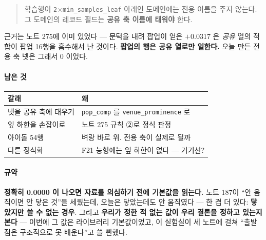 \documentclass[10pt]{article}
\begin{document}
\begin{quote}\small
학습행이 \texttt{2$\times$min\_samples\_leaf} 아래인 도메인에는 전용 이름을
주지 않는다. 그 도메인의 레코드 필드는 \textbf{공유 축 이름에 태워야} 한다.
\end{quote}

근거는 노트 275에 이미 있었다 --- 문턱을 내려 팝업이 얻은 $+$0.0317 은
\emph{공유} 열의 적합이 팝업 16행을 흡수해서 난 것이다. \textbf{팝업의 행은
공유 열로만 일한다.} 오늘 만든 전용 축 넷은 그래서 0 이었다.

\paragraph{남은 것}
\begin{center}\small
\begin{tabular}{ll}
\hline
갈래 & 왜 \\
\hline
넷을 공유 축에 태우기 & \texttt{pop\_comp} 를 \texttt{venue\_prominence} 로 \\
잎 하한을 손잡이로 & 노트 275 규칙 ②로 정식 판정 \\
아이돌 54행 & 벼랑 바로 위. 전용 축이 실제로 될까 \\
다른 정식화 & F21 능형에는 잎 하한이 없다 --- 거기선? \\
\hline
\end{tabular}
\end{center}

\paragraph{규약} \textbf{정확히 0.0000 이 나오면 자료를 의심하기 전에 기본값을
읽는다.} 노트 187이 ``안 움직이면 안 닿은 것''을 세웠는데, 오늘은 닿았는데도
안 움직였다 --- 한 겹 더 있다: \textbf{닿았지만 쓸 수 없는 경우}. 그리고
\textbf{우리가 정한 적 없는 값이 우리 결론을 정하고 있는지 본다} --- 이번에
그 값은 라이브러리 기본값이었고, 이 실험실이 세 노트에 걸쳐 ``출발점은
구조적으로 못 배운다''고 쓸 뻔했다.
\end{document}
